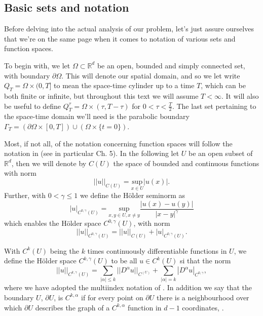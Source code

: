 \documentclass[11pt, a4paper]{article}
\begin{document}
\subsection{Basic sets and notation}
Before delving into the actual analysis of our problem, let's just assure ourselves that we're on the same page when it comes to notation of various sets and function spaces.

To begin with, we let $\Omega \subset \mathbb{R}^d$ be an open, bounded and simply connected set, with boundary $\partial \Omega$. This will denote our spatial domain, and so we let write $Q_T = \Omega \times (0,T]$ to mean the space-time cylinder up to a time $T$, which can be both finite or infinite, but throughout this text we will assume $T < \infty$. It will also be useful to define $Q_T^\tau = \Omega \times (\tau, T-\tau)$ for $0<\tau < \frac{T}{2}$. The last set pertaining to the space-time domain we'll need is the parabolic boundary $\Gamma_T = (\partial \Omega \times [0,T]) \cup (\Omega\times \{t=0\})$.


Most, if not all, of the notation concerning function spaces will follow the notation in \citep{evans} (see in particular Ch. 5). In the following let $U$ be an open subset of $\mathbb{R}^d$, then we will denote by $C(U)$ the space of bounded and continuous functions with norm
\begin{equation*}
||u||_{C(U)} = \underset{x \in U}{\mathrm{sup}}|u(x)|.
\end{equation*}
Further, with $0< \gamma \leq 1$ we define the Hölder seminorm as
\begin{equation*}
|u|_{C^{0,\gamma}(U)} = \underset{x,y \in U, x\neq y}{\mathrm{sup}}\frac{|u(x)-u(y)|}{|x-y|^\gamma}
\end{equation*}
which enables the Hölder space $C^{0,\gamma}(U)$, with norm
\begin{equation*}
||u||_{C^{0,\gamma}(U)} = ||u||_{C(U)} + |u|_{C^{0,\gamma}(U)}.
\end{equation*}

With $C^k(U)$ being the $k$ times continuously differentiable functions in $U$, we define the Hölder space $C^{k,\gamma}(U)$ to be all $u \in C^{k}(U)$ si that the norm
\begin{equation*}
||u||_{C^{k,\gamma}(U)} = \sum_{|\alpha| \leq k} ||D^\alpha u||_{C^(U)} + \sum_{|\alpha| = k} |D^\alpha u |_{C^{0,\gamma}},
\end{equation*}
where we have adopted the multiindex notation of \citep{evans}. In addition we say that the boundary $U$, $\partial U$, is $C^{k, \alpha}$ if for every point on $\partial U$ there is a neighbourhood over which $\partial U$ describes the graph of a $C^{k,\alpha}$ function in $d-1$ coordinates, \citep{gilbarg2001elliptic}.
\end{document}
